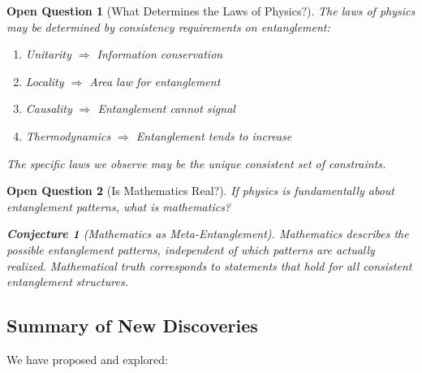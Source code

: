 \documentclass[12pt,a4paper]{article}
\newtheorem{conjecture}[theorem]{Conjecture}
\newtheorem*{openquestion}{Open Question}
\begin{document}
\begin{openquestion}[What Determines the Laws of Physics?]
The laws of physics may be determined by consistency requirements on entanglement:
\begin{enumerate}
    \item Unitarity $\Rightarrow$ Information conservation
    \item Locality $\Rightarrow$ Area law for entanglement
    \item Causality $\Rightarrow$ Entanglement cannot signal
    \item Thermodynamics $\Rightarrow$ Entanglement tends to increase
\end{enumerate}
The specific laws we observe may be the unique consistent set of constraints.
\end{openquestion}

\begin{openquestion}[Is Mathematics Real?]
If physics is fundamentally about entanglement patterns, what is mathematics?
\begin{conjecture}[Mathematics as Meta-Entanglement]
Mathematics describes the \textit{possible} entanglement patterns, independent of which patterns are actually realized. Mathematical truth corresponds to statements that hold for \textit{all} consistent entanglement structures.
\end{conjecture}
\end{openquestion}

\subsection{Summary of New Discoveries}

We have proposed and explored:
\end{document}
